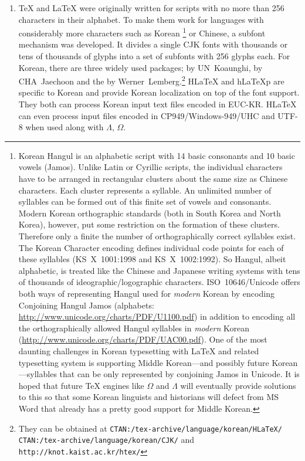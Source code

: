 \documentclass[twoside,letterpaper,11pt]{article}
\begin{document}
\begin{enumerate}
\item \TeX{} and \LaTeX{} were originally written for
scripts with no more than 256 characters in their alphabet.
To make them work for languages with considerably 
more characters such as
Korean%
 \footnote{Korean Hangul is an alphabetic script with 14 basic consonants
 and 10 basic vowels (Jamos). Unlike Latin or Cyrillic scripts, the
 individual characters have to be arranged in rectangular
 clusters about the same size as Chinese characters. Each cluster
 represents a syllable. An unlimited number of syllables can be
 formed out of this finite set of vowels and consonants. Modern Korean
 orthographic standards (both in South Korea and  North Korea), however,
 put some restriction on the formation of these clusters.
 Therefore only a finite the number of  orthographically correct syllables exist.
 The Korean Character encoding defines individual code points for each of these syllables (KS~X~1001:1998 and KS~X~1002:1992). So Hangul, albeit alphabetic, is
 treated like the Chinese and Japanese writing systems with tens of thousands of
 ideographic/logographic characters.  ISO~10646/Unicode offers both ways of
 representing Hangul used for \emph{modern} Korean by encoding Conjoining
 Hangul Jamos (alphabets: \url{http://www.unicode.org/charts/PDF/U1100.pdf})
 in addition to encoding all the orthographically allowed Hangul syllables in
 \emph{modern} Korean (\url{http://www.unicode.org/charts/PDF/UAC00.pdf}).
 One of the most daunting challenges in Korean typesetting with
 \LaTeX{} and related typesetting system is supporting Middle Korean---and possibly future Korean---syllables that can be only represented
 by conjoining Jamos in Unicode. It is hoped that future \TeX{} engines like $\Omega$ and
 $\Lambda$ will eventually provide solutions to this
 so that some Korean linguists and historians
 will defect from MS Word that already has  a pretty good support 
 for Middle Korean.}
or Chinese, a subfont mechanism was developed.
It divides a single CJK fonts with  thousands or tens of thousands of
glyphs into a set of subfonts with 256 glyphs each. 
For Korean, there are three widely used packages;  
by UN~Koaunghi,  by CHA~Jaechoon and the 
by Werner~Lemberg.\footnote{%
They can be obtained at \texttt{CTAN:/tex-archive/language/korean/HLaTeX/}\\
   \texttt{CTAN:/tex-archive/language/korean/CJK/} and
   \texttt{http://knot.kaist.ac.kr/htex/}}
H\LaTeX{} and h\LaTeX{}p are specific to Korean and provide
Korean localization on top of the font support.
They both can process Korean input text files encoded in EUC-KR. H\LaTeX{} can
even process input files encoded in CP949/Windows-949/UHC and UTF-8
when used along with $\Lambda$, $\Omega$.


\end{enumerate}
\end{document}
